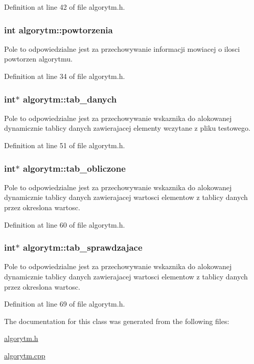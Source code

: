 Definition at line 42 of file algorytm.\-h.

\hypertarget{classalgorytm_a6f208bf8705cfe407a3b7dea8b1e871c}{
\subsubsection[{powtorzenia}]{\setlength{\rightskip}{0pt plus 5cm}int algorytm\-::powtorzenia}}\label{classalgorytm_a6f208bf8705cfe407a3b7dea8b1e871c}
Pole to odpowiedzialne jest za przechowywanie informacji mowiacej o ilosci powtorzen algorytmu. 

Definition at line 34 of file algorytm.\-h.

\hypertarget{classalgorytm_a7bbde139599763bf8b36d21c6f314a1a}{
\subsubsection[{tab\-\_\-danych}]{\setlength{\rightskip}{0pt plus 5cm}int$\ast$ algorytm\-::tab\-\_\-danych}}\label{classalgorytm_a7bbde139599763bf8b36d21c6f314a1a}
Pole to odpowiedzialne jest za przechowywanie wskaznika do alokowanej dynamicznie tablicy danych zawierajacej elementy wczytane z pliku testowego. 

Definition at line 51 of file algorytm.\-h.

\hypertarget{classalgorytm_a02dd561c7411091f78e0d058bb1485df}{
\subsubsection[{tab\-\_\-obliczone}]{\setlength{\rightskip}{0pt plus 5cm}int$\ast$ algorytm\-::tab\-\_\-obliczone}}\label{classalgorytm_a02dd561c7411091f78e0d058bb1485df}
Pole to odpowiedzialne jest za przechowywanie wskaznika do alokowanej dynamicznie tablicy danych zawierajacej wartosci elementow z tablicy danych przez okreslona wartosc. 

Definition at line 60 of file algorytm.\-h.

\hypertarget{classalgorytm_a67ec91f63071c85dea86bed4b77d5239}{
\subsubsection[{tab\-\_\-sprawdzajace}]{\setlength{\rightskip}{0pt plus 5cm}int$\ast$ algorytm\-::tab\-\_\-sprawdzajace}}\label{classalgorytm_a67ec91f63071c85dea86bed4b77d5239}
Pole to odpowiedzialne jest za przechowywanie wskaznika do alokowanej dynamicznie tablicy danych zawierajacej wartosci elementow z tablicy danych przez okreslona wartosc. 

Definition at line 69 of file algorytm.\-h.



The documentation for this class was generated from the following files\-:\begin{DoxyCompactItemize}
\item 
\hyperlink{algorytm_8h}{algorytm.\-h}\item 
\hyperlink{algorytm_8cpp}{algorytm.\-cpp}\end{DoxyCompactItemize}
